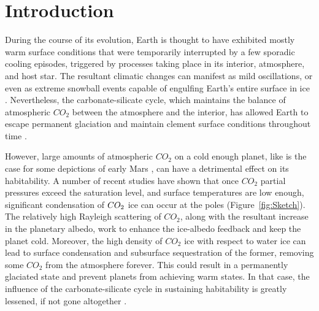 \documentclass[fleqn,usenatbib]{mnras}
\begin{document}


\section{Introduction}

During the course of its evolution, Earth is thought to have exhibited mostly warm surface conditions that were temporarily interrupted by a few sporadic cooling episodes, triggered by processes taking place in its interior, atmosphere, and host star. The resultant climatic changes can manifest as mild oscillations, or even as extreme snowball events capable of engulfing Earth's entire surface in ice \citep{kirschvink1992,Hoffman1342}. Nevertheless, the carbonate-silicate cycle, which maintains the balance of atmospheric $CO_{\mathrm{2}}$ between the atmosphere and the interior, has allowed Earth to escape permanent glaciation and maintain clement surface conditions throughout time \citep{Hoffman1342}.

However, large amounts of atmospheric $CO_{\mathrm{2}}$ on a cold enough planet, like is the case for some depictions of early Mars \citep{Kasting1991,wordsworth2013}, can have a detrimental effect on its habitability. A number of recent studies \citep{Kasting1991,Phumbert2005,Phumbert2011, forget2013,Soto2015, Turbet2017,kadoya_outer_2019} have shown that once $CO_{\mathrm{2}}$ partial pressures exceed the saturation level, and surface temperatures are low enough, significant condensation of $CO_{\rm 2}$ ice can occur at the poles (Figure~\ref{fig:Sketch}). The relatively high Rayleigh scattering of $CO_{\mathrm{2}}$, along with the resultant increase in the planetary albedo, work to enhance the ice-albedo feedback \citep{Kasting1991} and keep the planet cold. Moreover, the high density of $CO_{\mathrm{2}}$ ice with respect to water ice can lead to surface condensation and subsurface sequestration of the former, removing some $CO_{\mathrm{2}}$ from the atmosphere forever. This could result in a permanently glaciated state and prevent planets from achieving warm states. In that case,  the influence of the carbonate-silicate cycle in sustaining habitability is greatly lessened, if not gone altogether \citep{Turbet2017}.  
\end{document}

